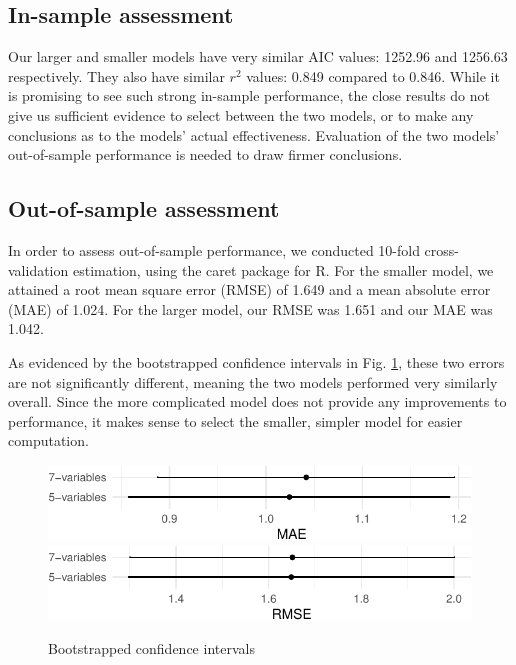 \documentclass[a4paper,9pt,twocolumn,twoside,]{pinp}
\begin{document}
\hypertarget{in-sample-assessment}{%
\subsection{In-sample assessment}\label{in-sample-assessment}}

Our larger and smaller models have very similar AIC values: 1252.96 and
1256.63 respectively. They also have similar \(r^2\) values: 0.849
compared to 0.846. While it is promising to see such strong in-sample
performance, the close results do not give us sufficient evidence to
select between the two models, or to make any conclusions as to the
models' actual effectiveness. Evaluation of the two models'
out-of-sample performance is needed to draw firmer conclusions.

\hypertarget{out-of-sample-assessment}{%
\subsection{Out-of-sample assessment}\label{out-of-sample-assessment}}

In order to assess out-of-sample performance, we conducted 10-fold
cross-validation estimation, using the caret package for R. For the
smaller model, we attained a root mean square error (RMSE) of 1.649 and
a mean absolute error (MAE) of 1.024. For the larger model, our RMSE was
1.651 and our MAE was 1.042.

As evidenced by the bootstrapped confidence intervals in Fig.
\ref{fig:out-sample}, these two errors are not significantly different,
meaning the two models performed very similarly overall. Since the more
complicated model does not provide any improvements to performance, it
makes sense to select the smaller, simpler model for easier computation.

\begin{figure}[htbp]

{\centering \includegraphics[width=0.85\linewidth]{Executive-summary_files/figure-latex/out-sample-1} \includegraphics[width=0.85\linewidth]{Executive-summary_files/figure-latex/out-sample-2} 

}

\caption{Bootstrapped confidence intervals}\label{fig:out-sample}
\end{figure}
\end{document}
